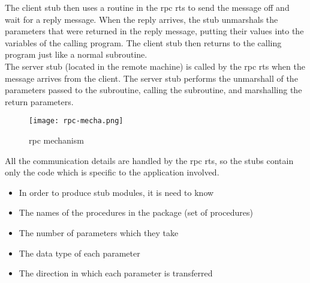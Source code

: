 The client stub then uses a routine in the \acrshort{rpc} \acrfull{rts} to send the message off and wait for a reply message. When the reply arrives, the stub unmarshals the parameters that were returned in the reply message, putting their values into the variables of the calling program. The client stub then returns to the calling program just like a normal subroutine.\\

The server stub (located in the remote machine) is called by the \acrshort{rpc} \acrshort{rts} when the message arrives from the client. The server stub performs the unmarshall of the parameters passed to the subroutine, calling the subroutine, and marshalling the return parameters.
\begin{figure}[h]
    \centering
    \texttt{[image: rpc-mecha.png]}
    \caption{\acrshort{rpc} mechanism}
    \label{fig:rpc_mechanism}
\end{figure}
All the communication details are handled by the \acrshort{rpc} \acrshort{rts}, so the stubs contain only the code which is specific to the application involved\cite{rpc2}.
\begin{itemize}
    \item In order to produce stub modules, it is need to know
    \item The names of the procedures in the package (set of procedures)
    \item The number of parameters which they take
    \item The data type of each parameter
    \item The direction in which each parameter is transferred
\end{itemize}
